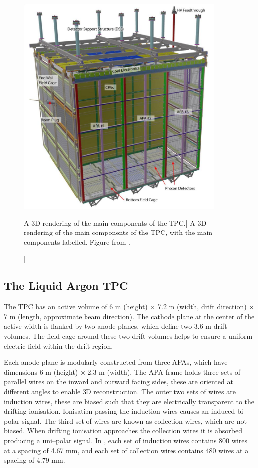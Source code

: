 \begin{figure}

	\centering

	\includegraphics[width=0.9\textwidth]{figures/pdsp_tpc.jpg}

	\caption
	[A 3D rendering of the main components of the \protodune{} TPC.]
	{A 3D rendering of the main components of the \protodune{} TPC, with the main
	components labelled. Figure from \cite{Abi:2017aow}.}

	\label{fig:pdsp_tpc}

\end{figure}

\subsection{The Liquid Argon TPC}

The \protodune{} TPC has an active volume of 6 m (height) $\times$ 7.2 m (width,
drift direction) $\times$ 7 m (length, approximate beam direction). The cathode 
plane at the center of the active width is flanked by two anode planes, which 
define two 3.6 m drift volumes. The field cage around these two drift volumes
helps to ensure a uniform electric field within the drift region.

Each anode plane is modularly constructed from three APAs, which have dimensions
6 m (height) $\times$ 2.3 m (width). The APA frame holds three sets of parallel
wires on the inward and outward facing sides, these are oriented at different 
angles to enable 3D reconstruction. The outer two sets of wires are induction
wires, these are biased such that they are electrically transparent to the 
drifting ionisation. Ionisation passing the induction wires causes an induced 
bi--polar signal. The third set of wires are known as collection wires, which
are not biased. When drifting ionisation approaches the collection wires 
it is absorbed producing a uni--polar signal. In \protodune{}, each set of 
induction wires contains 800 wires at a spacing of 4.67 mm, and each set of 
collection wires contains 480 wires at a spacing of 4.79 mm. 

